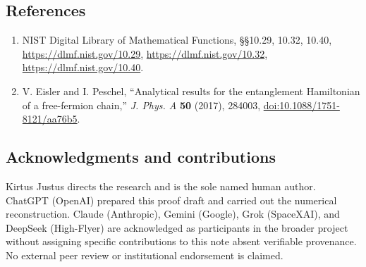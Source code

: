 \documentclass[
  10pt,
  a4paper,
]{article}
\providecommand{\tightlist}{%
  \setlength{\itemsep}{0pt}\setlength{\parskip}{0pt}}
\begin{document}
\subsection{References}\label{references}

\begin{enumerate}
\def\labelenumi{\arabic{enumi}.}
\tightlist
\item
  NIST Digital Library of Mathematical Functions, §§10.29, 10.32, 10.40, \url{https://dlmf.nist.gov/10.29}, \url{https://dlmf.nist.gov/10.32}, \url{https://dlmf.nist.gov/10.40}.
\item
  V. Eisler and I. Peschel, ``Analytical results for the entanglement Hamiltonian of a free-fermion chain,'' \emph{J. Phys. A} \textbf{50} (2017), 284003, \url{doi:10.1088/1751-8121/aa76b5}.
\end{enumerate}

\subsection{Acknowledgments and contributions}\label{acknowledgments-and-contributions}

Kirtus Justus directs the research and is the sole named human author. ChatGPT (OpenAI) prepared this proof draft and carried out the numerical reconstruction. Claude (Anthropic), Gemini (Google), Grok (SpaceXAI), and DeepSeek (High-Flyer) are acknowledged as participants in the broader project without assigning specific contributions to this note absent verifiable provenance. No external peer review or institutional endorsement is claimed.
\end{document}
